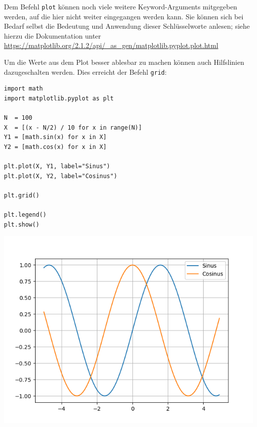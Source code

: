Dem Befehl \texttt{plot} können noch viele weitere Keyword-Arguments mitgegeben werden, auf die hier nicht weiter eingegangen werden kann. Sie können sich bei Bedarf selbst die Bedeutung und Anwendung dieser Schlüsselworte anlesen; siehe hierzu die Dokumentation unter 
\url{https://matplotlib.org/2.1.2/api/_as_gen/matplotlib.pyplot.plot.html}

Um die Werte aus dem Plot besser ablesbar zu machen können auch Hilfslinien dazugeschalten werden. Dies erreicht der Befehl \texttt{grid}:

\begin{codebox}[Beispiel: Plot mit Gitterlinien, width=.55\linewidth, nobeforeafter, equal height group = grpXmpSimplePlotGrid]
\begin{verbatim}
import math
import matplotlib.pyplot as plt

N  = 100
X  = [(x - N/2) / 10 for x in range(N)]
Y1 = [math.sin(x) for x in X]
Y2 = [math.cos(x) for x in X]

plt.plot(X, Y1, label="Sinus")
plt.plot(X, Y2, label="Cosinus")

plt.grid()

plt.legend()
plt.show()
\end{verbatim}
\end{codebox}
%
\begin{tcolorbox}[title=Ausgabe: Plot mit Gitterlinien, width=.45\linewidth, nobeforeafter, equal height group = grpXmpSimplePlotGrid]
	\includegraphics[width=\linewidth]{./gfx/plt-grid}
\end{tcolorbox}

